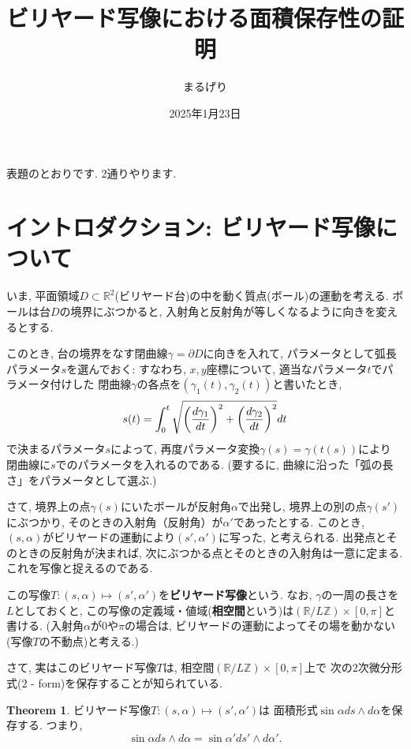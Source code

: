 \documentclass[a4paper]{ujarticle}
\title{ビリヤード写像における面積保存性の証明}
\numberwithin{equation}{section}
\theoremstyle{definition}
\newtheorem{theorem}{Theorem}
\begin{document}
\date{2025年1月23日}
\author{まるげり}

\maketitle
\setcounter{section}{-1}
表題のとおりです.
2通りやります.
\section{イントロダクション: ビリヤード写像について}

    いま, 平面領域$D \subset \mathbb{R}^2$(ビリヤード台)の中を動く質点(ボール)の運動を考える. 
    ボールは台$D$の境界にぶつかると, 入射角と反射角が等しくなるように向きを変えるとする.

    このとき, 台の境界をなす閉曲線$\gamma = \partial D$に向きを入れて, 
    パラメータとして弧長パラメータ$s$を選んでおく:
    すなわち, $x, y$座標について, 適当なパラメータ$t$でパラメータ付けした
    閉曲線$\gamma$の各点を$(\gamma_1(t), \gamma_2(t))$と書いたとき, 
    \[
        s(t) = \int_{0}^{t} \sqrt{\qty(\frac{d \gamma_1}{d t})^2 + \qty(\frac{d \gamma_2}{d t})^2} d t
    \]
    で決まるパラメータ$s$によって, 再度パラメータ変換$\gamma(s) = \gamma(t(s))$により
    閉曲線に$s$でのパラメータを入れるのである.
    (要するに, 曲線に沿った「弧の長さ」をパラメータとして選ぶ.)

    さて, 境界上の点$\gamma(s)$にいたボールが反射角$\alpha$で出発し,
    境界上の別の点$\gamma(s')$にぶつかり, そのときの入射角（反射角）が$\alpha'$であったとする.
    このとき, $(s, \alpha)$がビリヤードの運動により$(s', \alpha')$に写った, と考えられる.
    出発点とそのときの反射角が決まれば, 次にぶつかる点とそのときの入射角は一意に定まる.
    これを写像と捉えるのである.

    この写像$T: (s, \alpha) \mapsto (s', \alpha')$を\textbf{ビリヤード写像}という.
    なお, $\gamma$の一周の長さを$L$としておくと, 
    この写像の定義域・値域(\textbf{相空間}という)は$(\mathbb{R}/L \mathbb{Z}) \times [0, \pi]$と書ける.
    (入射角$\alpha$が$0$や$\pi$の場合は, ビリヤードの運動によってその場を動かない(写像$T$の不動点)と考える.)

    さて, 実はこのビリヤード写像$T$は, 相空間$(\mathbb{R}/L \mathbb{Z}) \times [0, \pi]$上で
    次の$2$次微分形式($2$ - form)を保存することが知られている.

    \begin{theorem}
        ビリヤード写像$T: (s, \alpha) \mapsto (s', \alpha')$は
        面積形式$\sin{\alpha} d s \wedge d \alpha$を保存する. 
        つまり, 
        \[
            \sin{\alpha} d s \wedge d \alpha = \sin{\alpha'} d s' \wedge d \alpha'.
        \]
    \end{theorem}
\end{document}
